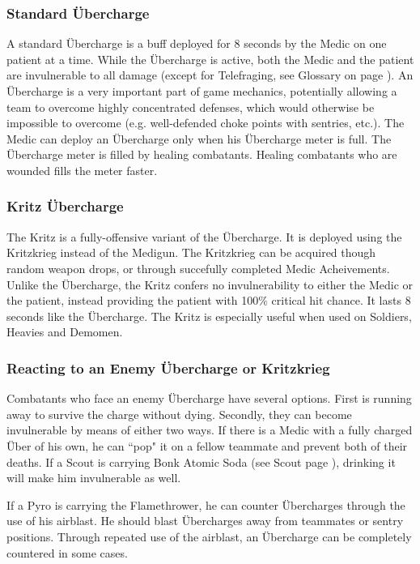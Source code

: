 \subsubsection{Standard Übercharge}
A standard Übercharge is a buff deployed for 8 seconds by the Medic on one patient at a time. While the Übercharge is active, both the Medic and the patient are invulnerable to all damage (except for Telefraging, see Glossary on page \pageref{Glossary}). An Übercharge is a very important part of game mechanics, potentially allowing a team to overcome highly concentrated defenses, which would otherwise be impossible to overcome (e.g. well-defended choke points with sentries, etc.). The Medic can deploy an Übercharge only when his Übercharge meter is full. The Übercharge meter is filled by healing combatants. Healing combatants who are wounded fills the meter faster.

\subsubsection{Kritz Übercharge}
The Kritz is a fully-offensive variant of the Übercharge. It is deployed using the Kritzkrieg instead of the Medigun.   The Kritzkrieg can be acquired though random weapon drops, or through succefully completed Medic Acheivements.  Unlike the Übercharge, the Kritz confers no invulnerability to either the Medic or the patient, instead providing the patient with 100\% critical hit chance. It lasts 8 seconds like the Übercharge. The Kritz is especially useful when used on Soldiers, Heavies and Demomen.  

\subsubsection{Reacting to an Enemy Übercharge or Kritzkrieg}
Combatants who face an enemy Übercharge have several options.  First is running away to survive the charge without dying. Secondly, they can become invulnerable by means of either two ways. If there is a Medic with a fully charged Über of his own, he can ``pop" it on a fellow teammate and prevent both of their deaths. If a Scout is carrying Bonk Atomic Soda (see Scout page \pageref{Scout}), drinking it will make him invulnerable as well.

If a Pyro is carrying the Flamethrower, he can counter Übercharges through the use of his airblast.  He should blast Übercharges away from teammates or sentry positions.  Through repeated use of the airblast, an Übercharge can be completely countered in some cases.

